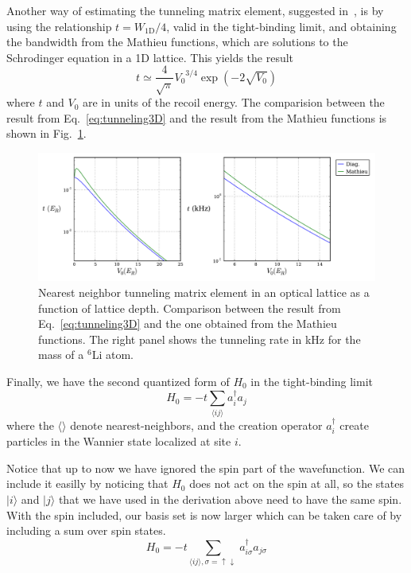\documentclass[oneside,11pt]{memoir}
\newcommand{\vo}{\ensuremath{V_{0}}}
\newcommand{\dbl}{\ensuremath{ \uparrow\! \downarrow \, }}
\begin{document}
Another way of estimating the tunneling matrix element, suggested
in~\cite{Bloch2008}, is by using the relationship $t=W_{\text{1D}}/4$, valid in
the tight-binding limit,  and obtaining the bandwidth from the Mathieu
functions, which are solutions to the Schrodinger equation in a 1D lattice.
This yields the result 
\begin{equation}
 t \simeq \frac{4}{\sqrt{\pi}} \vo^{3/4} \exp(-2\sqrt{\vo}) 
\end{equation} 
where $t$ and $\vo$ are in units of the recoil energy.   The comparision
between the result from Eq.~\ref{eq:tunneling3D} and the  result from the
Mathieu functions is shown in Fig.~\ref{fig:tMathieu}. 
\begin{figure}
\centering \includegraphics[width=\textwidth]{../figures/BandStructure_figures/tunneling_V0_Mathieu.pdf}
\caption[Nearest neighbor tunneling matrix element]{\small Nearest neighbor
tunneling matrix element in an optical lattice as a function of lattice depth.
Comparison between the result from Eq.~\ref{eq:tunneling3D} and the one
obtained from the Mathieu functions.  The right panel shows the tunneling rate
in kHz for the mass of a $^{6}$Li atom.  } \label{fig:tMathieu}
\end{figure}


Finally, we have the second quantized form of $H_{0}$ in the tight-binding
limit 
\begin{equation}
  H_{0} = -t \sum_{ \langle ij \rangle } a_{i}^{\dagger}a_{j} 
\end{equation}
where the $\langle \rangle$ denote nearest-neighbors, and the creation operator
$a_{i}^{\dagger}$ create particles in the Wannier state localized at site $i$.

Notice that up to now we have ignored the spin part of the wavefunction.   We
can include it easilly by noticing that $H_{0}$ does not act on the spin at
all, so the states $|i\rangle$ and $|j\rangle$ that we have used in the
derivation above need to have the same spin.   With the spin included, our
basis set is now larger which can be taken care of by including a sum over spin
states.   
\begin{equation}
  H_{0} = -t \sum_{ \langle ij \rangle, \sigma=\dbl   } a_{i\sigma}^{\dagger}a_{j\sigma} 
\end{equation}
\end{document}
